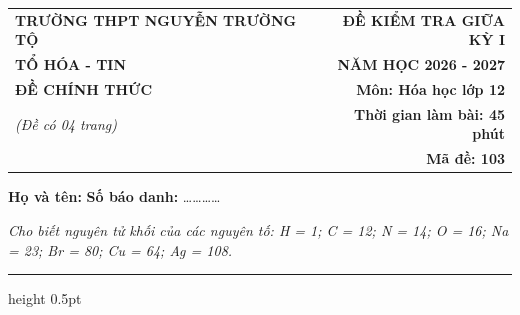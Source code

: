\documentclass[11pt,a4paper]{article}
\begin{document}
\noindent
\begin{tabularx}{\textwidth}{@{}X r@{}}
\textbf{TRƯỜNG THPT NGUYỄN TRƯỜNG TỘ} & \textbf{ĐỀ KIỂM TRA GIỮA KỲ I} \\
\textbf{TỔ HÓA - TIN} & \textbf{NĂM HỌC 2026 - 2027} \\
\textbf{ĐỀ CHÍNH THỨC} & \textbf{Môn: Hóa học lớp 12} \\
\textit{(Đề có 04 trang)} & \textbf{Thời gian làm bài: 45 phút} \\
& \textbf{Mã đề: 103}
\end{tabularx}

\vspace{2pt}
\noindent\textbf{Họ và tên:} \dotfill \textbf{Số báo danh:} \dots\dots\dots\dots

\vspace{2pt}
\noindent\textit{Cho biết nguyên tử khối của các nguyên tố: H = 1; C = 12; N = 14; O = 16; Na = 23; Br = 80; Cu = 64; Ag = 108.}
\vspace{2pt}
\hrule height 0.5pt
\vspace{6pt}

\vspace{4pt}
\end{document}
